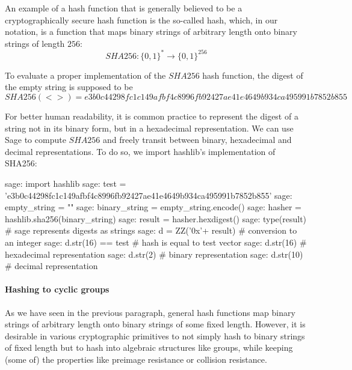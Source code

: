 \begin{example}\label{ex:SHA256}An example of a hash function that is generally believed to be a cryptographically secure hash function is the so-called  hash, which, in our notation, is a function that maps binary strings of arbitrary length onto binary strings of length $256$:
\begin{equation}
SHA256: \{0,1\}^* \to \{0,1\}^{256}
\end{equation}

 To evaluate a proper implementation of the $SHA256$ hash function, the digest of the empty string is supposed to be
\begin{equation}
SHA256(<>)= {\scriptstyle e3b0c44298fc1c149afbf4c8996fb92427ae41e4649b934ca495991b7852b855}
\end{equation}

For better human readability, it is common practice to represent the digest of a string not in its binary form, but in a hexadecimal representation. We can use Sage to compute $SHA256$ and freely transit between binary, hexadecimal and decimal representations. To do so, we import hashlib's implementation of SHA256:
\begin{sagecommandline}
sage: import hashlib
sage: test = 'e3b0c44298fc1c149afbf4c8996fb92427ae41e4649b934ca495991b7852b855' 
sage: empty_string = ""
sage: binary_string = empty_string.encode()
sage: hasher = hashlib.sha256(binary_string) 
sage: result = hasher.hexdigest()
sage: type(result)	# sage represents digests as strings
sage: d = ZZ('0x'+ result) # conversion to an integer
sage: d.str(16) == test	# hash is equal to test vector
sage: d.str(16) # hexadecimal representation
sage: d.str(2) # binary representation
sage: d.str(10) # decimal representation
\end{sagecommandline}
\end{example}

\paragraph{Hashing to cyclic groups} As we have seen in the previous paragraph, general hash functions map binary strings of arbitrary length onto binary strings of some fixed length. However, it is desirable in various cryptographic primitives to not simply hash to binary strings of fixed length but to hash into algebraic structures like groups, while keeping (some of) the properties like preimage resistance or collision resistance.


